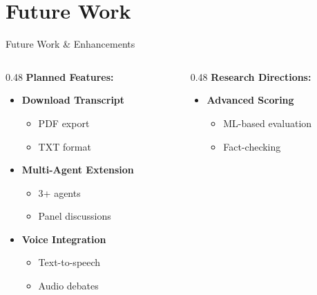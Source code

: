 \documentclass[aspectratio=169]{beamer}
\begin{document}
\section{Future Work}
\begin{frame}{Future Work \& Enhancements}
    \begin{columns}[t]
        \begin{column}{0.48\textwidth}
            \textbf{Planned Features:}
            \begin{itemize}
                \small
                \item \textbf{Download Transcript}
                \begin{itemize}
                    \footnotesize
                    \item PDF export
                    \item TXT format
                \end{itemize}
                
                \item \textbf{Multi-Agent Extension}
                \begin{itemize}
                    \footnotesize
                    \item 3+ agents
                    \item Panel discussions
                \end{itemize}
                
                \item \textbf{Voice Integration}
                \begin{itemize}
                    \footnotesize
                    \item Text-to-speech
                    \item Audio debates
                \end{itemize}
            \end{itemize}
        \end{column}
        
        \begin{column}{0.48\textwidth}
            \textbf{Research Directions:}
            \begin{itemize}
                \small
                \item \textbf{Advanced Scoring}
                \begin{itemize}
                    \footnotesize
                    \item ML-based evaluation
                    \item Fact-checking
                \end{itemize}
                

\end{itemize}
\end{column}
\end{columns}
\end{frame}
\end{document}
